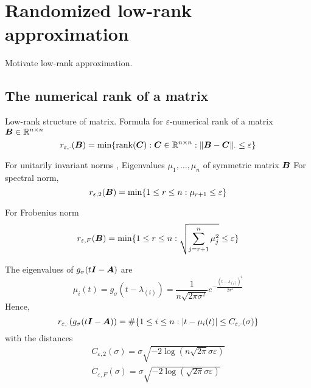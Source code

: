 \chapter{Randomized low-rank approximation}
\label{chp:3-nystrom}

Motivate low-rank approximation.


\section{The numerical rank of a matrix}
\label{sec:3-nystrom-numerical-rank}

Low-rank structure of matrix.
Formula for $\varepsilon$-numerical rank \cite[Definition~1.1]{noga2013rank} of a matrix $\boldsymbol{B} \in \mathbb{R}^{n \times n}$
\begin{equation}
    r_{\varepsilon, \cdot}(\boldsymbol{B}) = \min \{\operatorname{rank}(\boldsymbol{C}): \boldsymbol{C} \in \mathbb{R}^{n \times n}: \lVert \boldsymbol{B} - \boldsymbol{C} \rVert _{\cdot} \leq \varepsilon \}
    \label{equ:3-nystrom-SS-def-numerical-low-rank}
\end{equation}

For unitarily invariant norms \cite[Theorem~5]{mirsky1960truncation},
Eigenvalues $\mu_1, \dots, \mu_n$ of symmetric matrix $\boldsymbol{B}$
For spectral norm,
\begin{equation}
    r_{\varepsilon, 2}(\boldsymbol{B}) = \min \{1 \leq r \leq n: \mu_{r+1} \leq \varepsilon \}
    \label{equ:3-nystrom-SS-def-numerical-low-rank-spectral-norm}
\end{equation}

For Frobenius norm
\begin{equation}
    r_{\varepsilon, F}(\boldsymbol{B}) = \min \{1 \leq r \leq n: \sqrt{\sum_{j=r+1}^n \mu_{j}^2} \leq \varepsilon \}
    \label{equ:3-nystrom-SS-def-numerical-low-rank-frobenius-norm}
\end{equation}

The eigenvalues of $g_{\sigma}(t\boldsymbol{I} - \boldsymbol{A})$ are
\begin{equation}
    \mu_i(t) = g_{\sigma}(t - \lambda_{(i)}) = \frac{1}{n \sqrt{2 \pi \sigma^2}} e^{-\frac{(t - \lambda_{(i)})^2}{2 \sigma^2}}
\end{equation}
Hence, 
\begin{equation}
    r_{\varepsilon, \cdot}(g_{\sigma}(t\boldsymbol{I} - \boldsymbol{A})) = \#\{1\leq i\leq n: |t - \mu_i(t)| \leq C_{\varepsilon, \cdot}(\sigma)\}
\end{equation}
with the distances
\begin{align}
    C_{\varepsilon, 2}(\sigma) = \sigma \sqrt{-2 \log(n \sqrt{2 \pi} \sigma \varepsilon)} \\
    C_{\varepsilon, F}(\sigma) = \sigma \sqrt{-2 \log(\sqrt{2 \pi} \sigma \varepsilon)}
\end{align}

